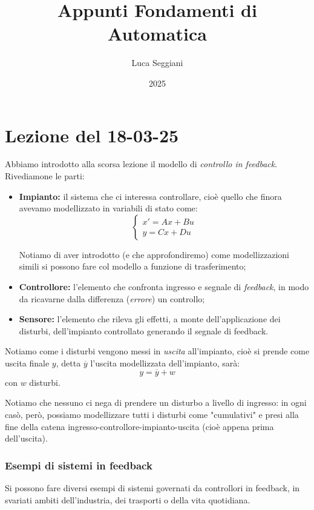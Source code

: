 \documentclass[a4paper,11pt]{article}
\title{Appunti Fondamenti di Automatica}
\author{Luca Seggiani}
\date{2025}
\begin{document}
\section{Lezione del 18-03-25}

\thispagestyle{empty}
\pagestyle{fancy}

Abbiamo introdotto alla scorsa lezione il modello di \textit{controllo in feedback}.
Rivediamone le parti:
\begin{itemize}
	\item \textbf{Impianto:} il sistema che ci interessa controllare, cioè quello che finora avevamo modellizzato in variabili di stato come:
		\[
			\begin{cases}		
			x' = Ax + Bu \\
			y = Cx + Du
			\end{cases}
		\]
		
		Notiamo di aver introdotto (e che approfondiremo) come modellizzazioni simili si possono fare col modello a funzione di trasferimento;
	\item \textbf{Controllore:} l'elemento che confronta ingresso e segnale di \textit{feedback}, in modo da ricavarne dalla differenza (\textit{errore}) un controllo;
	\item \textbf{Sensore:} l'elemento che rileva gli effetti, a monte dell'applicazione dei disturbi, dell'impianto controllato generando il segnale di feedback.
\end{itemize}

Notiamo come i disturbi vengono messi in \textit{uscita} all'impianto, cioè si prende come uscita finale $y$, detta $\overline{y}$ l'uscita modellizzata dell'impianto, sarà:
$$
y = \overline{y} + w
$$
con $w$ disturbi.

Notiamo che nessuno ci nega di prendere un disturbo a livello di ingresso: in ogni casò, però, possiamo modellizzare tutti i disturbi come "cumulativi" e presi alla fine della catena ingresso-controllore-impianto-uscita (cioè appena prima dell'uscita).

\subsubsection{Esempi di sistemi in feedback}
Si possono fare diversi esempi di sistemi governati da controllori in feedback, in svariati ambiti dell'industria, dei trasporti o della vita quotidiana.
\end{document}
